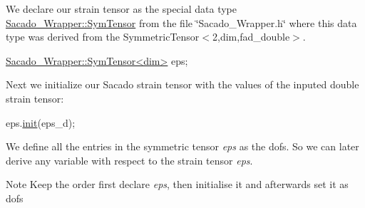 We declare our strain tensor as the special data type \hyperlink{classSacado__Wrapper_1_1SymTensor}{Sacado\+\_\+\+Wrapper\+::\+Sym\+Tensor} from the file \char`\"{}\+Sacado\+\_\+\+Wrapper.\+h\char`\"{} where this data type was derived from the Symmetric\+Tensor$<$2,dim,fad\+\_\+double$>$. 
\begin{DoxyCode}
\hyperlink{classSacado__Wrapper_1_1SymTensor}{Sacado\_Wrapper::SymTensor<dim>} eps;
\end{DoxyCode}
 Next we initialize our Sacado strain tensor with the values of the inputed double strain tensor\+: 
\begin{DoxyCode}
eps.\hyperlink{classSacado__Wrapper_1_1SymTensor_acbad579d5ead9e96ff46aa15d9b5aef4}{init}(eps\_d);
\end{DoxyCode}
 We define all the entries in the symmetric tensor {\itshape eps} as the dofs. So we can later derive any variable with respect to the strain tensor {\itshape eps}. \begin{DoxyNote}{Note}
Keep the order first declare {\itshape eps}, then initialise it and afterwards set it as dofs
\end{DoxyNote}

